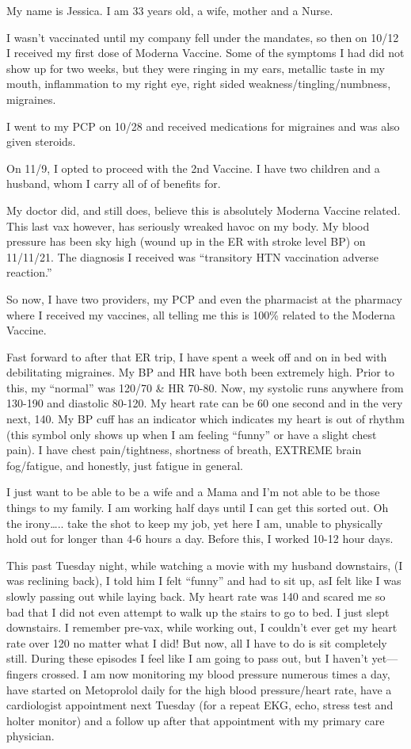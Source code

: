 My name is Jessica. I am 33 years old, a wife, mother and a Nurse.

I wasn’t vaccinated until my company fell under the mandates, so then on 10/12 I
received my first dose of Moderna Vaccine. Some of the symptoms I had did not
show up for two weeks, but they were ringing in my ears, metallic taste in my
mouth, inflammation to my right eye, right sided weakness/tingling/numbness,
migraines.

I went to my PCP on 10/28 and received medications for migraines and was also
given steroids.

On 11/9, I opted to proceed with the 2nd Vaccine. I have two children and a
husband, whom I carry all of of benefits for.

My doctor did, and still does, believe this is absolutely Moderna Vaccine
related. This last vax however, has seriously wreaked havoc on my body. My blood
pressure has been sky high (wound up in the ER with stroke level BP) on
11/11/21. The diagnosis I received was “transitory HTN vaccination adverse
reaction.”

So now, I have two providers, my PCP and even the pharmacist at the pharmacy
where I received my vaccines, all telling me this is 100\% related to the
Moderna Vaccine.

Fast forward to after that ER trip, I have spent a week off and on in bed with
debilitating migraines. My BP and HR have both been extremely high. Prior to
this, my “normal” was 120/70 \& HR 70-80. Now, my systolic runs anywhere from
130-190 and diastolic 80-120. My heart rate can be 60 one second and in the very
next, 140. My BP cuff has an indicator which indicates my heart is out of rhythm
(this symbol only shows up when I am feeling “funny” or have a slight chest
pain). I have chest pain/tightness, shortness of breath, EXTREME brain
fog/fatigue, and honestly, just fatigue in general.

I just want to be able to be a wife and a Mama and I’m not able to be those
things to my family. I am working half days until I can get this sorted out. Oh
the irony….. take the shot to keep my job, yet here I am, unable to physically
hold out for longer than 4-6 hours a day. Before this, I worked 10-12 hour days.

This past Tuesday night, while watching a movie with my husband downstairs, (I
was reclining back), I told him I felt “funny” and had to sit up, asI felt like
I was slowly passing out while laying back. My heart rate was 140 and scared me
so bad that I did not even attempt to walk up the stairs to go to bed. I just
slept downstairs. I remember pre-vax, while working out, I couldn’t ever get my
heart rate over 120 no matter what I did! But now, all I have to do is sit
completely still. During these episodes I feel like I am going to pass out, but
I haven’t yet— fingers crossed. I am now monitoring my blood pressure numerous
times a day, have started on Metoprolol daily for the high blood pressure/heart
rate, have a cardiologist appointment next Tuesday (for a repeat EKG, echo,
stress test and holter monitor) and a follow up after that appointment with my
primary care physician.

